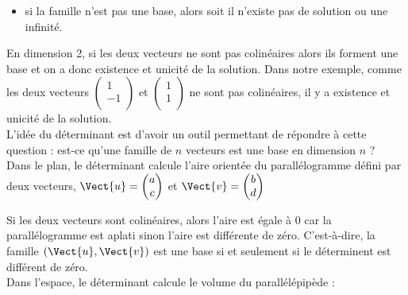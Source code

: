 \documentclass{book}
\begin{document}
\begin{Exemple}
\begin{itemize}
\item si la famille n'est pas une base, alors soit il n'existe pas de solution ou une infinité.   
\end{itemize}
En dimension 2,  si les deux vecteurs  ne sont pas colinéaires alors ils forment une base et on a donc existence et unicité de la solution.  Dans notre exemple,  comme les deux vecteurs  $\begin{pmatrix}
 1    \\
 -1   \\
\end{pmatrix}$ et $\begin{pmatrix}
 1   \\
  1  \\
\end{pmatrix}$ ne sont pas colinéaires, il y a existence et  unicité de la  solution.\\
L'idée du déterminant est d'avoir un outil permettant de répondre à cette question : est-ce qu'une famille de $n$ vecteurs est une base  en dimension $n$ ?\\
Dans le plan, le déterminant calcule l'aire orientée du parallélogramme défini par deux vecteurs, $\Vect{u}=\begin{pmatrix}
a\\c
\end{pmatrix}$ et $\Vect{v}=\begin{pmatrix}
b\\d
\end{pmatrix}$  
\begin{center}
\end{center}
Si les deux vecteurs sont colinéaires, alors l'aire est égale à 0 car la parallélogramme est aplati  sinon l'aire est différente de zéro. C'est-à-dire, la famille $(\Vect{u},\Vect{v})$ est une base si et seulement si le déterminent est différent de zéro. \\
Dans l'espace,  le déterminant calcule le volume du parallélépipède : 
\begin{center}
\end{center}
\end{Exemple}
\end{document}
